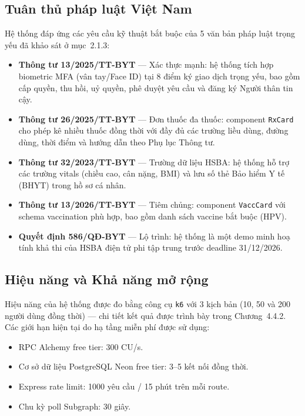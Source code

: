 \documentclass[../DoAn]{subfiles}
\begin{document}
\subsection{Tuân thủ pháp luật Việt Nam}

Hệ thống đáp ứng các yêu cầu kỹ thuật bắt buộc của 5 văn bản pháp luật trọng yếu đã khảo sát ở mục~2.1.3:

\begin{itemize}
    \item \textbf{Thông tư 13/2025/TT-BYT} --- Xác thực mạnh: hệ thống tích hợp biometric MFA (vân tay/Face ID) tại 8 điểm ký giao dịch trọng yếu, bao gồm cấp quyền, thu hồi, uỷ quyền, phê duyệt yêu cầu và đăng ký Người thân tin cậy.
    \item \textbf{Thông tư 26/2025/TT-BYT} --- Đơn thuốc đa thuốc: component \texttt{RxCard} cho phép kê nhiều thuốc đồng thời với đầy đủ các trường liều dùng, đường dùng, thời điểm và hướng dẫn theo Phụ lục Thông tư.
    \item \textbf{Thông tư 32/2023/TT-BYT} --- Trường dữ liệu HSBA: hệ thống hỗ trợ các trường vitals (chiều cao, cân nặng, BMI) và lưu số thẻ Bảo hiểm Y tế (BHYT) trong hồ sơ cá nhân.
    \item \textbf{Thông tư 13/2026/TT-BYT} --- Tiêm chủng: component \texttt{VaccCard} với schema vaccination phù hợp, bao gồm danh sách vaccine bắt buộc (HPV).
    \item \textbf{Quyết định 586/QĐ-BYT} --- Lộ trình: hệ thống là một demo minh hoạ tính khả thi của HSBA điện tử phi tập trung trước deadline 31/12/2026.
\end{itemize}

\subsection{Hiệu năng và Khả năng mở rộng}

Hiệu năng của hệ thống được đo bằng công cụ \texttt{k6} \cite{k6} với 3 kịch bản (10, 50 và 200 người dùng đồng thời) --- chi tiết kết quả được trình bày trong Chương~4.4.2. Các giới hạn hiện tại do hạ tầng miễn phí được sử dụng:

\begin{itemize}
    \item RPC Alchemy free tier: 300 CU/s.
    \item Cơ sở dữ liệu PostgreSQL Neon free tier: \mbox{3--5} kết nối đồng thời.
    \item Express rate limit: 1000 yêu cầu / 15 phút trên mỗi route.
    \item Chu kỳ poll Subgraph: 30 giây.
\end{itemize}
\end{document}
